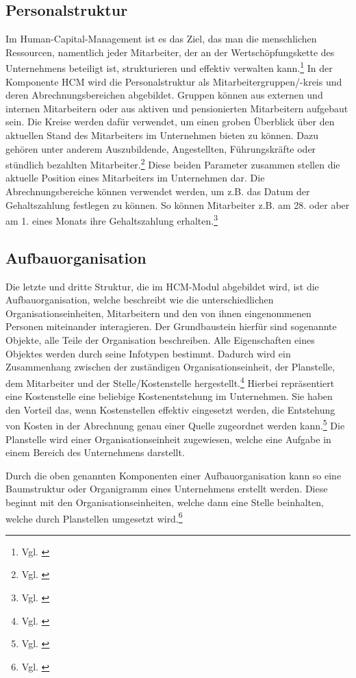 \subsection{Personalstruktur}
Im Human-Capital-Management ist es das Ziel, das man die menschlichen Ressourcen, namentlich jeder Mitarbeiter, der an der Wertschöpfungskette des Unternehmens beteiligt ist, strukturieren und effektiv verwalten kann.\footnote{Vgl. \cite{GablerWirtschaftslexikon2018}}
In der Komponente HCM wird die Personalstruktur als Mitarbeitergruppen/-kreis und deren Abrechnungsbereichen abgebildet.
Gruppen können aus externen und internen Mitarbeitern oder aus aktiven und pensionierten Mitarbeitern aufgebaut sein.
Die Kreise werden dafür verwendet, um einen groben Überblick über den aktuellen Stand des Mitarbeiters im Unternehmen bieten zu können.
Dazu gehören unter anderem Auszubildende, Angestellten, Führungskräfte oder stündlich bezahlten Mitarbeiter.\footnote{Vgl. \cite{SAPSE2024a}}
Diese beiden Parameter zusammen stellen die aktuelle Position eines Mitarbeiters im Unternehmen dar. Die Abrechnungsbereiche können verwendet werden, um z.B. das Datum der Gehaltszahlung festlegen zu können.
So können Mitarbeiter z.B. am 28. oder aber am 1. eines Monats ihre Gehaltszahlung erhalten.\footnote{Vgl. \cite{SAPSE2024a}}

\subsection{Aufbauorganisation}
Die letzte und dritte Struktur, die im HCM-Modul abgebildet wird, ist die Aufbauorganisation, welche beschreibt wie die unterschiedlichen Organisationseinheiten, Mitarbeitern und den von ihnen eingenommenen Personen miteinander interagieren.
Der Grundbaustein hierfür sind sogenannte Objekte, alle Teile der Organisation beschreiben. Alle Eigenschaften eines Objektes werden durch seine Infotypen bestimmt.
Dadurch wird ein Zusammenhang zwischen der zuständigen Organisationseinheit, der Planstelle, dem Mitarbeiter und der Stelle/Kostenstelle hergestellt.\footnote{Vgl. \cite{SSSUM2019a}}
Hierbei repräsentiert eine Kostenstelle eine beliebige Kostenentstehung im Unternehmen.
Sie haben den Vorteil das, wenn Kostenstellen effektiv eingesetzt werden, die Entstehung von Kosten in der Abrechnung genau einer Quelle zugeordnet werden kann.\footnote{Vgl. \cite{SAPSE2024b}}
Die Planstelle wird einer Organisationseinheit zugewiesen, welche eine Aufgabe in einem Bereich des Unternehmens darstellt.

Durch die oben genannten Komponenten einer Aufbauorganisation kann so eine Baumstruktur oder Organigramm eines Unternehmens erstellt werden.
Diese beginnt mit den Organisationseinheiten, welche dann eine Stelle beinhalten, welche durch Planstellen umgesetzt wird.\footnote{Vgl. \cite{SAPSE2024c}}


